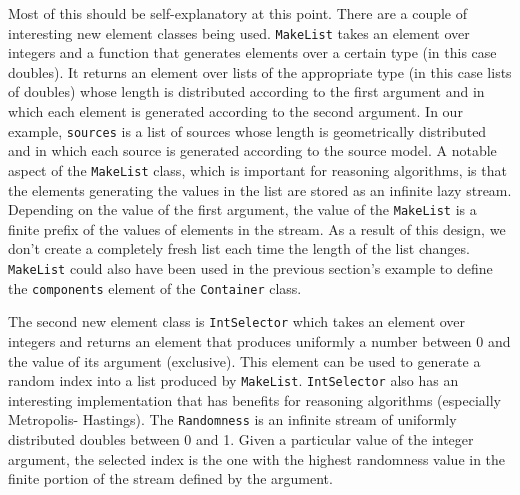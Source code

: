 Most of this should be self-explanatory at this point. There are a couple of interesting new element classes being used. \texttt{MakeList} takes an element over integers and a function that generates elements over a certain type (in this case doubles). It returns an element over lists of the appropriate type (in this case lists of doubles) whose length is distributed according to the first argument and in which each element is generated according to the second argument. In our example, \texttt{sources} is a list of sources whose length is geometrically distributed and in which each source is generated according to the source model. A notable aspect of the \texttt{MakeList} class, which is important for reasoning algorithms, is that the elements generating the values in the list are stored as an infinite lazy stream. Depending on the value of the first argument, the value of the \texttt{MakeList} is a finite prefix of the values of elements in the stream. As a result of this design, we don't create a completely fresh list each time the length of the list changes. \texttt{MakeList} could also have been used in the previous section's example to define the \texttt{components} element of the \texttt{Container} class.

The second new element class is \texttt{IntSelector} which takes an element over integers and returns an element that produces uniformly a number between 0 and the value of its argument (exclusive). This element can be used to generate a random index into a list produced by \texttt{MakeList}. \texttt{IntSelector} also has an interesting implementation that has benefits for reasoning algorithms (especially Metropolis- Hastings). The \texttt{Randomness} is an infinite stream of uniformly distributed doubles between 0 and 1. Given a particular value of the integer argument, the selected index is the one with the highest randomness value in the finite portion of the stream defined by the argument.




